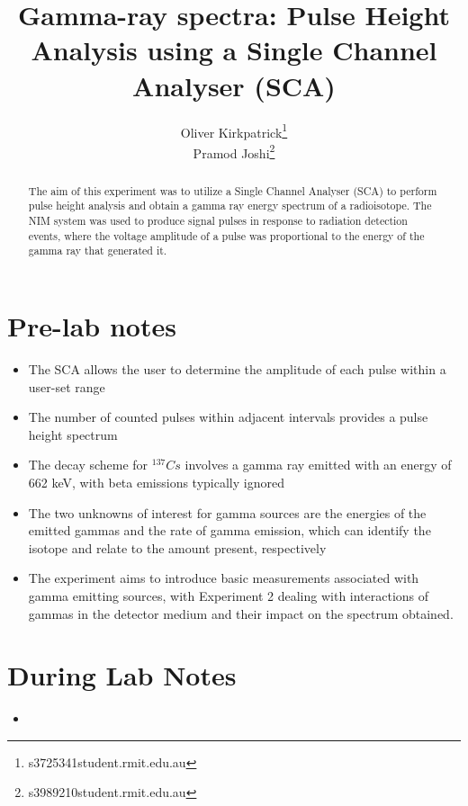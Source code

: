 \documentclass{article}
\title{Gamma-ray spectra: Pulse Height Analysis using a
Single Channel Analyser (SCA)}
\author{
    Oliver Kirkpatrick\footnote{s3725341\@ student.rmit.edu.au}\\
    Pramod Joshi\footnote{s3989210\@ student.rmit.edu.au}
}
\begin{document}
\maketitle
\begin{abstract}
    The aim of this experiment was to utilize a Single Channel Analyser (SCA) to perform pulse height analysis and obtain a gamma ray energy spectrum of a radioisotope. The NIM system was used to produce signal pulses in response to radiation detection events, where the voltage amplitude of a pulse was proportional to the energy of the gamma ray that generated it. %
\end{abstract}
\section{Pre-lab notes}
\begin{itemize}
    \item The SCA allows the user to determine the amplitude of each pulse within a user-set range
    \item The number of counted pulses within adjacent intervals provides a pulse height spectrum
    \item The decay scheme for $^{137}Cs$ involves a gamma ray emitted with an energy of 662 keV, with beta emissions typically ignored
    \item The two unknowns of interest for gamma sources are the energies of the emitted gammas and the rate of gamma emission, which can identify the isotope and relate to the amount present, respectively
    \item The experiment aims to introduce basic measurements associated with gamma emitting sources, with Experiment 2 dealing with interactions of gammas in the detector medium and their impact on the spectrum obtained.
\end{itemize}
\section{During Lab Notes}
\begin{itemize}
    \item 
\end{itemize}
\end{document}
